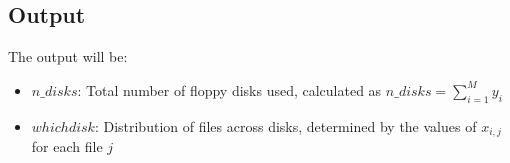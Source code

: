 \documentclass{article}
\begin{document}
\subsection*{Output}
The output will be:
\begin{itemize}
    \item \( n\_disks \): Total number of floppy disks used, calculated as \( n\_disks = \sum_{i=1}^{M} y_i \)
    \item \( whichdisk \): Distribution of files across disks, determined by the values of \( x_{i,j} \) for each file \( j \)
\end{itemize}
\end{document}
